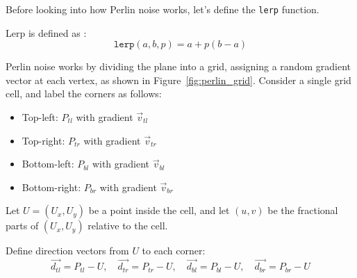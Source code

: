 Before looking into how Perlin noise works, let's define the \texttt{lerp} function.
\begin{definition}
	Lerp is defined as :
	\[
		\texttt{lerp}(a, b, p) = a + p(b - a)
	\]
\end{definition}


Perlin noise works by dividing the plane into a grid, assigning a random gradient vector at each vertex, as shown in Figure~\ref{fig:perlin_grid}. Consider a single grid cell, and label the corners as follows:
\begin{itemize}
\item{Top-left: $P_{tl}$ with gradient $\vec{v}_{tl}$}
\item{Top-right: $P_{tr}$ with gradient $\vec{v}_{tr}$}
\item{Bottom-left: $P_{bl}$ with gradient $\vec{v}_{bl}$}
\item{Bottom-right: $P_{br}$ with gradient $\vec{v}_{br}$}
\end{itemize}

Let $U = (U_x, U_y)$ be a point inside the cell, and let $(u, v)$ be the fractional parts of $(U_x, U_y)$ relative to the cell.

Define direction vectors from $U$ to each corner:
\[
\vec{d_{tl}} = P_{tl} - U, \quad \vec{d_{tr}} = P_{tr} - U, \quad \vec{d_{bl}} = P_{bl} - U, \quad \vec{d_{br}} = P_{br} - U
\]

